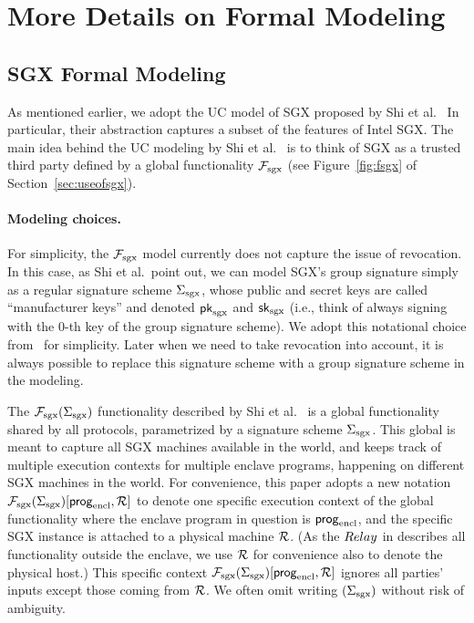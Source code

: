 
\newcommand{\ucstring}[1]{{\color{black} #1}}

\section{More Details on Formal Modeling} 
\subsection{SGX Formal Modeling}
\label{sec:sgxmodel}


As mentioned earlier, we adopt the 
UC model of SGX proposed by Shi et al.~\cite{sgxsok}
In particular, their 
abstraction captures a subset of the features 
of Intel SGX. 
The main idea behind the UC modeling by Shi et al.~\cite{sgxsok}
is to think of SGX 
as a trusted third party defined by 
a global functionality $\mathcal{F}_{\textrm{sgx}}$ (see Figure~\ref{fig:fsgx} of 
Section~\ref{sec:useofsgx}).

\paragraph{Modeling choices.}
For simplicity, the $\mathcal{F}_{\textrm{sgx}}$ model currently does not 
capture the issue of revocation.
In this case, as Shi et al.~point out, 
we can model SGX's group signature
simply as a regular signature scheme ${\Sigma_{\textrm{sgx}}}$, whose
public and secret keys 
are called ``manufacturer keys'' and denoted ${\sf pk}_{\mathrm{sgx}}$ and ${\sf sk}_{\mathrm{sgx}}$ 
(i.e., think of always signing 
with the 0-th key of the group signature scheme).
We adopt this notational choice from~\cite{sgxsok} %
for simplicity. Later when 
we need to take revocation into account,
it is always possible to replace this signature 
scheme with a group signature scheme in the modeling.

The $\mathcal{F}_{\textrm{sgx}}({\Sigma_{\textrm{sgx}}})$ functionality described by Shi et al.~\cite{sgxsok} %
is a global functionality shared by all protocols, parametrized
by a signature scheme ${\Sigma_{\textrm{sgx}}}$.
This global \fsgx 
is meant to capture all SGX machines available in the world,
and keeps track of 
multiple execution contexts
for multiple enclave programs, happening on different SGX machines in the world.
For convenience, 
this paper adopts a new notation
$\mathcal{F}_{\textrm{sgx}}({\Sigma_{\textrm{sgx}}})[{\sf prog}_{\textrm{encl}}, \mathcal{R}]$
to denote 
one specific execution context of the global \fsgx
functionality where the enclave program in question is ${\sf prog}_{\textrm{encl}}$,
and the specific SGX instance is attached to a physical machine $\mathcal{R}$.
(As the ${Relay}$ in \tc describes all functionality outside the enclave, we use $\mathcal{R}$ for convenience also to denote the physical host.)
This specific context 
$\mathcal{F}_{\textrm{sgx}}({\Sigma_{\textrm{sgx}}})[{\sf prog}_{\textrm{encl}}, \mathcal{R}]$
ignores all parties' inputs except those coming from $\mathcal{R}$.
We often omit writing $({\Sigma_{\textrm{sgx}}})$ without risk of ambiguity.


